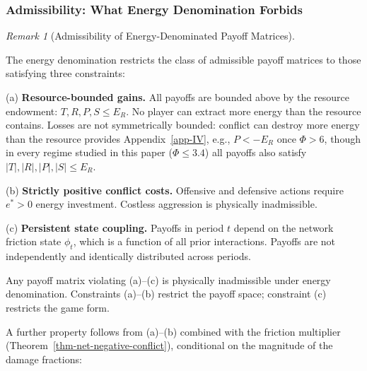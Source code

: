 \documentclass[11pt]{article}
\theoremstyle{plain}
\theoremstyle{definition}
\theoremstyle{remark}
\newtheorem{remark}{Remark}
\let\origsubsubsection\subsubsection
\renewcommand{\subsubsection}{\needspace{4\baselineskip}\origsubsubsection}
\begin{document}
\subsubsection{Admissibility: What Energy Denomination
Forbids}\label{admissibility-what-energy-denomination-forbids}

\begin{remark}[Admissibility of Energy-Denominated Payoff Matrices]
\label{rmk-admissibility}

The energy denomination restricts the class of admissible payoff matrices to those satisfying three constraints:

(a) \textbf{Resource-bounded gains.} All payoffs are bounded above by the resource endowment: $T, R, P, S \leq E_R$. No player can extract more energy than the resource contains. Losses are not symmetrically bounded: conflict can destroy more energy than the resource provides Appendix~\ref{app-IV}, e.g., $P < -E_R$ once $\Phi > 6$, though in every regime studied in this paper ($\Phi \leq 3.4$) all payoffs also satisfy $|T|, |R|, |P|, |S| \leq E_R$.

(b) \textbf{Strictly positive conflict costs.} Offensive and defensive actions require $e^* > 0$ energy investment. Costless aggression is physically inadmissible.

(c) \textbf{Persistent state coupling.} Payoffs in period $t$ depend on the network friction state $\phi_t$, which is a function of all prior interactions. Payoffs are not independently and identically distributed across periods.

Any payoff matrix violating (a)–(c) is physically inadmissible under energy denomination. Constraints (a)–(b) restrict the payoff space; constraint (c) restricts the game form.

A further property follows from (a)–(b) combined with the friction multiplier (Theorem~\ref{thm-net-negative-conflict}), conditional on the magnitude of the damage fractions:


\end{remark}
\end{document}
